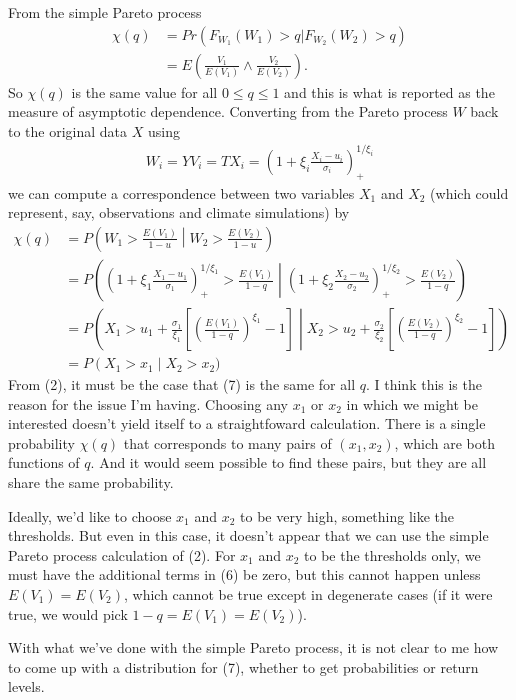 \documentclass[12pt]{article}
\begin{document}
From the simple Pareto process
\begin{align}
\chi(q) &= Pr(F_{W_1}(W_1) > q | F_{W_2}(W_2) > q)  \\
        &= E\left(\frac{V_1}{E(V_1)} \wedge \frac{V_2}{E(V_2)}\right).
\end{align}
So $\chi(q)$ is the same value for all $0\leq q\leq 1$ and this is what is reported as the measure of asymptotic dependence. Converting from the Pareto process $W$ back to the original data $X$ using
\begin{align}
W_i = YV_i = TX_i = \left(1 + \xi_i\frac{X_i - u_i}{\sigma_i}\right)_+^{1/\xi_i}
\end{align}
we can compute a correspondence between two variables $X_1$ and $X_2$ (which could represent, say, observations and climate simulations) by
\begin{align}
\chi(q) &= P\left(W_1 > \frac{E(V_1)}{1-u} \middle| W_2 > \frac{E(V_2)}{1-u}\right) \\
    &= P\left(\left(1 + \xi_1\frac{X_1-u_1}{\sigma_1}\right)_+^{1/\xi_1} > \frac{E(V_1)}{1-q} \middle| \left(1 + \xi_2\frac{X_2-u_2}{\sigma_2}\right)_+^{1/\xi_2} > \frac{E(V_2)}{1-q}\right) \\
    &= P\left(X_1 > u_1 + \frac{\sigma_1}{\xi_1}\left[\left(\frac{E(V_1)}{1-q}\right)^{\xi_1}-1\right] \middle| X_2 > u_2 + \frac{\sigma_2}{\xi_2}\left[\left(\frac{E(V_2)}{1-q}\right)^{\xi_2}-1\right]\right) \\
    &= P\left(X_1 > x_1 \middle| X_2 > x_2)
\end{align}
From (2), it must be the case that (7) is the same for all $q$. I think this is the reason for the issue I'm having. Choosing any $x_1$ or $x_2$ in which we might be interested doesn't yield itself to a straightfoward calculation. There is a single probability $\chi(q)$ that corresponds to many pairs of $(x_1, x_2)$, which are both functions of $q$. And it would seem possible to find these pairs, but they are all share the same probability.
\bigskip

Ideally, we'd like to choose $x_1$ and $x_2$ to be very high, something like the thresholds. But even in this case, it doesn't appear that we can use the simple Pareto process calculation of (2). For $x_1$ and $x_2$ to be the thresholds only, we must have the additional terms in (6) be zero, but this cannot happen unless $E(V_1)=E(V_2)$, which cannot be true except in degenerate cases (if it were true, we would pick $1-q=E(V_1)=E(V_2)$).
\bigskip

With what we've done with the simple Pareto process, it is not clear to me how to come up with a distribution for (7), whether to get probabilities or return levels.
\end{document}

